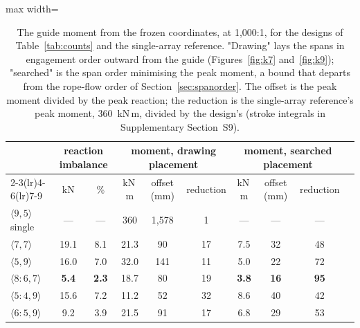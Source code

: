 \documentclass[preprint,12pt,number]{elsarticle}
\newcommand{\cfg}[2]{\langle #1,#2\rangle}
\begin{document}
\begin{table}[H]
\centering
\caption{The guide moment from the frozen coordinates, at 1,000:1, for the designs of Table~\ref{tab:counts} and the single-array reference. "Drawing" lays the spans in engagement order outward from the guide (Figures~\ref{fig:k7} and~\ref{fig:k9}); "searched" is the span order minimising the peak moment, a bound that departs from the rope-flow order of Section~\ref{sec:spanorder}. The offset is the peak moment divided by the peak reaction; the reduction is the single-array reference's peak moment, 360~kN\,m, divided by the design's (stroke integrals in Supplementary Section~S9).}
\label{tab:moment}
\footnotesize
\begin{adjustbox}{max width=\linewidth}
\begin{tabular}{@{}lccccccccc@{}}
\toprule
& \multicolumn{2}{c}{reaction imbalance} & \multicolumn{3}{c}{moment, drawing placement} & \multicolumn{3}{c}{moment, searched placement} \\
\cmidrule(lr){2-3}\cmidrule(lr){4-6}\cmidrule(lr){7-9}
& kN & \% & kN\,m & offset (mm) & reduction & kN\,m & offset (mm) & reduction \\
\midrule
$\cfg{9}{5}$ single & --- & --- & 360 & 1,578 & 1 & --- & --- & --- \\
$\cfg{7}{7}$ & 19.1 & 8.1 & 21.3 & 90 & 17 & 7.5 & 32 & 48 \\
$\cfg{5}{9}$ & 16.0 & 7.0 & 32.0 & 141 & 11 & 5.0 & 22 & 72 \\
$\cfg{8{:}6}{7}$ & \textbf{5.4} & \textbf{2.3} & 18.7 & 80 & 19 & \textbf{3.8} & \textbf{16} & \textbf{95} \\
$\cfg{5{:}4}{9}$ & 15.6 & 7.2 & 11.2 & 52 & 32 & 8.6 & 40 & 42 \\
$\cfg{6{:}5}{9}$ & 9.2 & 3.9 & 21.5 & 91 & 17 & 6.8 & 29 & 53 \\
\bottomrule
\end{tabular}
\end{adjustbox}
\end{table}
\end{document}
